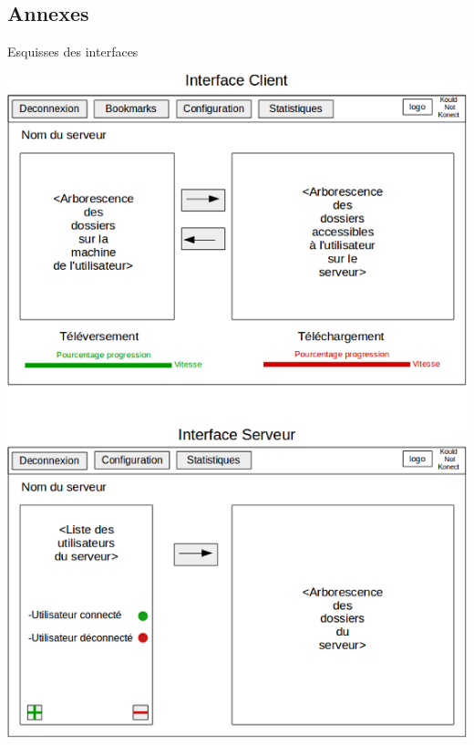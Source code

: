 \documentclass{article}
\begin{document}
\subsection*{Annexes}
Esquisses des interfaces\\
\begin{center}
	\includegraphics{Interface_projet_gl.png}
\end{center}
\end{document}
